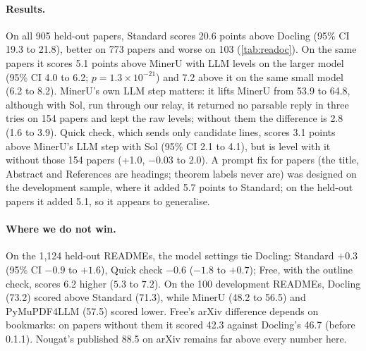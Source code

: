 \documentclass[10pt,twocolumn,letterpaper]{article}
\begin{document}
\paragraph{Results.} On all 905 held-out papers, Standard scores 20.6 points above Docling (95\% CI
19.3 to 21.8), better on 773 papers and worse on 103 (\cref{tab:readoc}). On the same papers it
scores 5.1 points above MinerU with LLM levels on the larger model (95\% CI 4.0 to 6.2;
$p=1.3\times10^{-21}$) and 7.2 above it on the same small model (6.2 to 8.2). MinerU's own LLM step
matters: it lifts MinerU from 53.9 to 64.8, although with Sol, run through our relay, it returned no
parsable reply in three tries on 154 papers and kept the raw levels; without them the difference is
2.8 (1.6 to 3.9).
Quick check, which sends only candidate lines, scores 3.1 points above MinerU's LLM step with Sol
(95\% CI 2.1 to 4.1), but is level with it without those 154 papers (+1.0, $-0.03$ to 2.0). A prompt fix
for papers (the title, Abstract and References are headings; theorem labels never are) was designed
on the development sample, where it added 5.7 points to Standard; on the held-out papers it added
5.1, so it appears to generalise.

\paragraph{Where we do not win.} On the 1,124 held-out READMEs, the model settings tie Docling: Standard
$+0.3$ (95\% CI $-0.9$ to $+1.6$), Quick check $-0.6$ ($-1.8$ to $+0.7$); Free, with the outline
check, scores 6.2 higher ($5.3$ to $7.2$). On the 100 development READMEs, Docling (73.2) scored above Standard (71.3), while MinerU
(48.2 to 56.5) and PyMuPDF4LLM (57.5) scored lower. Free's arXiv difference depends on bookmarks: on
papers without them it scored 42.3 against Docling's 46.7 (before 0.1.1). Nougat's published 88.5 on arXiv remains
far above every number here.
\end{document}
